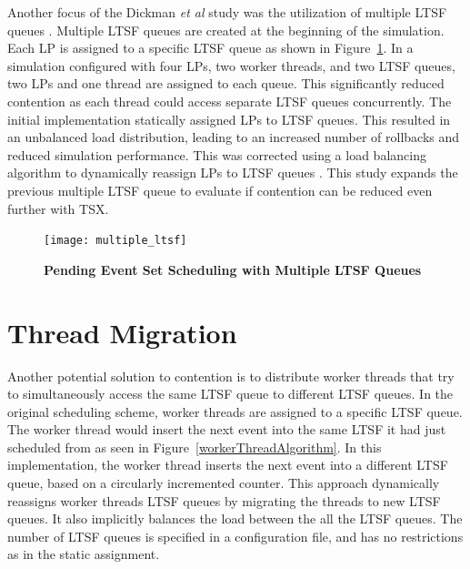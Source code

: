\documentclass[11pt]{book}
\begin{document}
Another focus of the Dickman \emph{et al} study was the utilization of multiple LTSF
queues \cite{dickman}.  Multiple LTSF queues are created at the beginning of the
simulation.  Each LP is assigned to a specific LTSF queue as shown in
Figure~\ref{fig:multipleLTSF}.  In a simulation configured with four LPs, two worker
threads, and two LTSF queues, two LPs and one thread are assigned to each queue.  This
significantly reduced contention as each thread could access separate LTSF queues
concurrently.  The initial implementation statically assigned LPs to LTSF queues.  This
resulted in an unbalanced load distribution, leading to an increased number of rollbacks
and reduced simulation performance.  This was corrected using a load balancing algorithm
to dynamically reassign LPs to LTSF queues \cite{dickman}.  This study expands the
previous multiple LTSF queue to evaluate if contention can be reduced even further with
TSX.

\begin{figure}
    \centering
    \graphicspath{ {./figures/} }
    \texttt{[image: multiple\_ltsf]}
    \caption{\textbf{Pending Event Set Scheduling with Multiple LTSF
        Queues}}\label{fig:multipleLTSF}
\end{figure}

\section{Thread Migration}

Another potential solution to contention is to distribute worker threads that try to
simultaneously access the same LTSF queue to different LTSF queues.  In the original
scheduling scheme, worker threads are assigned to a specific LTSF queue.  The worker
thread would insert the next event into the same LTSF it had just scheduled from as seen
in Figure~\ref{workerThreadAlgorithm}.  In this implementation, the worker thread inserts
the next event into a different LTSF queue, based on a circularly incremented counter.
This approach dynamically reassigns worker threads LTSF queues by migrating the threads to
new LTSF queues.  It also implicitly balances the load between the all the LTSF queues.
The number of LTSF queues is specified in a configuration file, and has no restrictions as
in the static assignment.
\end{document}
